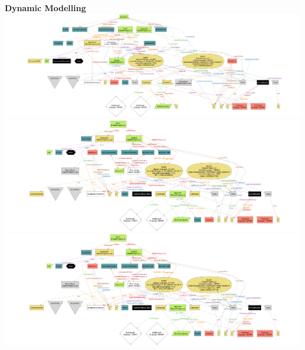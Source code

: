   \newpage
  \textbf{Dynamic Modelling}
  \\
     \includegraphics[scale=0.8]{Images/Alloy/Progress_1.png}
          \includegraphics[scale=0.8]{Images/Alloy/Progress_2.png}
               \includegraphics[scale=0.8]{Images/Alloy/Progress_3.png}
